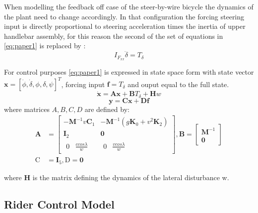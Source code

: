 When modelling the feedback off case of the steer-by-wire bicycle the dynamics of the plant need to change accordingly. In that configuration the forcing steering input is directly proportional to steering acceleration times the inertia of upper handlebar assembly, for this reason the second of the set of equations in \ref{eq:paper1} is replaced by :
\begin{equation}
    I_{F_{xx}}\ddot{\delta} = T_{\delta}
\end{equation}

 For control purposes \cref{eq:paper1} is expressed in state space form with state vector \ensuremath{\mathbf{x}=[\dot{\phi}, \dot{\delta}, \phi, \delta, \psi]^{T}}, forcing input \ensuremath{\mathbf{f}=T_{\delta}} and ouput equal to the full state.
 \begin{equation}
    \dot{\mathbf{x}}=\mathbf{A} \mathbf{x}+\mathbf{B} T_\delta + \mathbf{H} w
    \label{eq:bikeEOM}
\end{equation}
\begin{equation}
    \mathbf{y}=\mathbf{C} \mathbf{x}+\mathbf{D} \mathbf{f}
\end{equation}
where matrices \ensuremath{A,B,C,D} are defined by:
\begin{align}
    \mathbf{A} &=\begin{bmatrix}
        -\mathbf{M}^{-1}v\mathbf{C}_{1} & -\mathbf{M}^{-1}(g \mathbf{K}_{0}+v^{2}\mathbf{K}_{2}) \\
        {\mathbf{I}_2}                    & {\mathbf{0}} \\  {\begin{matrix} {0} & { \frac{c cos\lambda}{w}}\end{matrix}} &  {\begin{matrix} 0 & { \frac{v cos\lambda}{w}}\end{matrix} } 
    \end{bmatrix} , \mathbf{B}=\left[ \begin{array}{c}{\mathbf{M}^{-1}} \\ {\mathbf{0}}\end{array}\right] \\
    \mathrm{C} &= {\mathbf{I}_5} , \mathrm{D}=\mathbf{0} 
\end{align}

where \ensuremath{\mathbf{H}} is the matrix defining the dynamics of the lateral disturbance w. 

\subsection{Rider Control Model}\label{subsec:rider_model}

